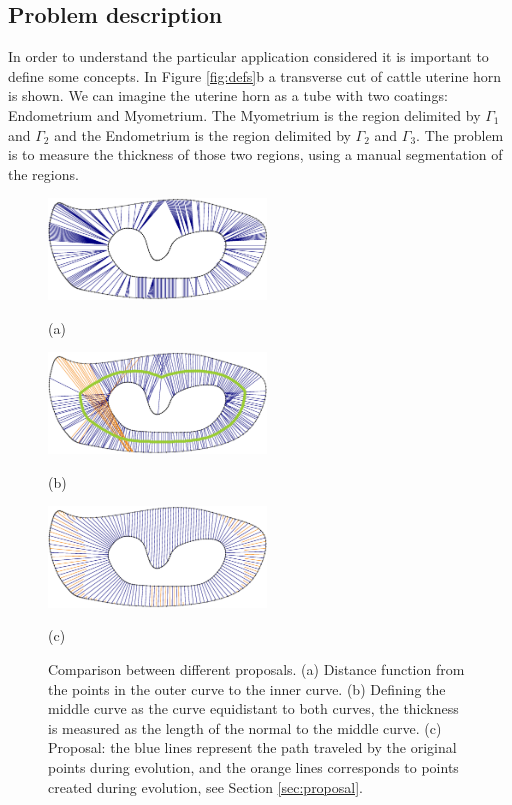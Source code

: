 \documentclass{article}
\begin{document}
\subsection{Problem description}
\label{ssec:description}
In order to understand the particular application considered it is important to define some concepts. In Figure \ref{fig:defs}b a transverse cut of cattle uterine horn is shown. We can imagine the uterine horn as a tube with two coatings: Endometrium and Myometrium. The Myometrium is the region delimited by $\Gamma_1$ and $\Gamma_2$ and the Endometrium is the region delimited by $\Gamma_2$ and $\Gamma_3$. The problem is to measure the thickness of those two regions, using a manual segmentation of the regions.
\begin{figure}[t]
\begin{minipage}[b]{.32\linewidth}
  \centering
  \centerline{\includegraphics[width=5.8cm]{pics/cmp_dist}}
  \centerline{(a)}\medskip
\end{minipage}
\hfill
\begin{minipage}[b]{.32\linewidth}
  \centering
  \centerline{\includegraphics[width=5.8cm]{pics/cmp_norm2}}
  \centerline{(b)}\medskip
\end{minipage}
\hfill
\begin{minipage}[b]{.32\linewidth}
  \centering
  \centerline{\includegraphics[width=5.8cm]{pics/cmp_evol}}
  \centerline{(c)}\medskip
\end{minipage}
\caption{Comparison between different proposals. (a) Distance function from the points in the outer curve to the inner curve. (b) Defining the middle curve as the curve equidistant to both curves, the thickness is measured as the length of the normal to the middle curve. (c) Proposal: the blue lines represent the path traveled by the original points during evolution, and the orange lines corresponds to points created during evolution, see Section \ref{sec:proposal}.}
\label{fig:comp}
\end{figure}
\end{document}

